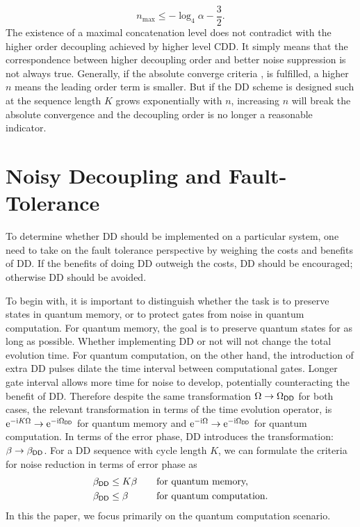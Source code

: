 \documentclass[aps,pra,reprint,superscriptaddress]{revtex4-2}
\newcommand{\Odd}{\Omega_{\mathsf{DD}}}
\begin{document}
\begin{equation}\label{eq:cdd-max-level}
n_{\max}\le -\log_4\alpha-\frac{3}{2}.
\end{equation}
The existence of a maximal concatenation level does not contradict with
the higher order decoupling achieved by higher level CDD. 
It simply means that the correspondence between higher decoupling order and better noise suppression is not always true. 
Generally, if the absolute converge criteria , is fulfilled, a higher $n$ means the leading order term is smaller. 
But if the DD scheme is designed such at the sequence length $K$ grows exponentially with $n$,
increasing $n$ will break the absolute convergence and the decoupling order is no longer a reasonable indicator. 



\section{Noisy Decoupling and Fault-Tolerance}

To determine whether DD should be implemented on a particular system,
one need to take on the fault tolerance perspective by weighing the costs and benefits of DD. If the benefits of doing DD outweigh the costs, DD should be encouraged; otherwise DD should be avoided. 

To begin with, it is important to 
distinguish whether the task is to preserve states in quantum memory, or to protect gates from noise in quantum computation. 
For quantum memory, the goal is to preserve quantum states for as long as possible. Whether implementing DD or not will not change the total evolution time. For quantum computation, on the other hand, the introduction of extra DD pulses dilate the time interval between computational gates.  Longer gate interval allows more time for noise to develop, potentially counteracting the benefit of DD.
Therefore despite the same transformation $\Omega\to \Omega_{\mathsf{DD}}$ for both cases, the relevant transformation in terms of the time evolution operator, is $\upe^{-\upi K \Omega} \rightarrow\upe^{-\upi \Odd}$ for quantum memory and  $\upe^{-\upi \Omega} \rightarrow\upe^{-\upi \Odd}$ for quantum computation. 
In terms of the error phase, DD introduces the transformation: $\beta \to \beta_{\mathsf{DD}}$.
For a DD sequence with cycle length $K$, we can formulate the  criteria for noise reduction in terms of error phase as
\begin{align*} 
\beta_{\mathsf{DD}}&\le K\beta \quad &&\text{for quantum memory,}   \\
\beta_{\mathsf{DD}}&\le \beta \quad &&\text{for quantum computation.}
\end{align*}
In this the paper, we focus primarily on the quantum computation scenario.
\end{document}
